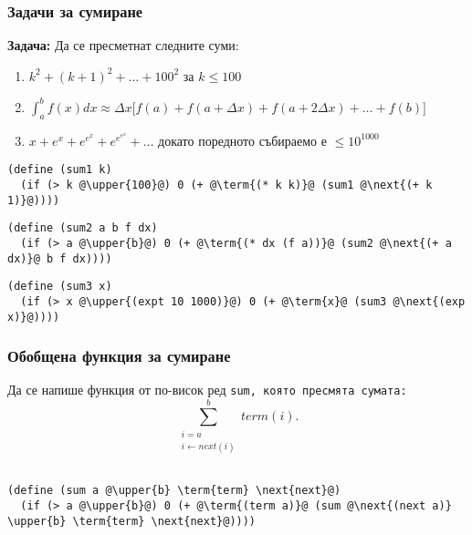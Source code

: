 \documentclass{beamer}
\begin{document}
\begin{frame}[fragile]
  \frametitle{Задачи за сумиране}

  \textbf{Задача:} Да се пресметнат следните суми:
  \begin{enumerate}
  \item $k^2 + (k+1)^2 + \ldots + 100^2$ за $k \leq 100$
  \item $\int_a^b f(x)dx \approx \Delta x\big[f(a) + f(a+\Delta x) + f(a+2\Delta x) + \ldots + f(b)\big]$
  \item $x + e^x + e^{e^x} + e^{e^{e^x}} + \ldots$ докато поредното събираемо е $\leq 10^{1000}$
  \end{enumerate}
  \pause
  \newcommand{\upper}{\textcolor<5->{red}}
  \newcommand{\term}{\textcolor<6->{green}}
  \newcommand{\next}{\textcolor<7->{blue}}
\begin{lstlisting}
(define (sum1 k)
  (if (> k @\upper{100}@) 0 (+ @\term{(* k k)}@ (sum1 @\next{(+ k 1)}@))))
\end{lstlisting}
  \pause
\begin{lstlisting}
(define (sum2 a b f dx)
  (if (> a @\upper{b}@) 0 (+ @\term{(* dx (f a))}@ (sum2 @\next{(+ a dx)}@ b f dx))))
\end{lstlisting}
  \pause
\begin{lstlisting}
(define (sum3 x)
  (if (> x @\upper{(expt 10 1000)}@) 0 (+ @\term{x}@ (sum3 @\next{(exp x)}@))))
\end{lstlisting}

\end{frame}

\begin{frame}[fragile]
  \frametitle{Обобщена функция за сумиране}
  Да се напише функция от по-висок ред \tt{sum}, която пресмята сумата:
  \begin{equation*}
    \sum_{\substack{i=a \\i \leftarrow next(i)}}^b term(i).
  \end{equation*}
  \pause
  \newcommand{\upper}{\textcolor{red}}
  \newcommand{\term}{\textcolor{green}}
  \newcommand{\next}{\textcolor{blue}}
\begin{lstlisting}
(define (sum a @\upper{b} \term{term} \next{next}@)
  (if (> a @\upper{b}@) 0 (+ @\term{(term a)}@ (sum @\next{(next a)} \upper{b} \term{term} \next{next}@))))
\end{lstlisting}
\end{frame}
\end{document}
